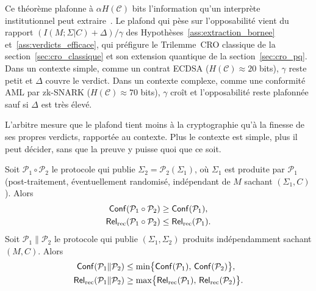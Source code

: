 \begin{sloppypar}
Ce th\'eor\`eme plafonne \`a $\alpha H(\mathcal{C})$ bits l'information qu'un interpr\`ete
institutionnel peut extraire~\cite{Smith09,Alvim12}. Le plafond qui p\`ese sur
l'opposabilit\'e vient du rapport $(I(M;\Sigma|C)+\Delta)/\gamma$ des Hypoth\`eses~\ref{ass:extraction_bornee}
et~\ref{ass:verdicts_efficace}, qui pr\'efigure le Trilemme~CRO classique de la section~\ref{sec:cro_classique} et son extension quantique de la section~\ref{sec:cro_pq}. Dans un contexte
simple, comme un contrat ECDSA ($H(\mathcal{C}) \approx 20$ bits), $\gamma$ reste petit et
$\Delta$ couvre le verdict. Dans un contexte complexe, comme une conformit\'e AML par
zk-SNARK ($H(\mathcal{C}) \approx 70$ bits), $\gamma$ cro\^it et l'opposabilit\'e reste plafonn\'ee
sauf si $\Delta$ est tr\`es \'elev\'e.

\begin{boiteArbitre}
L'arbitre mesure que le plafond tient moins \`a la cryptographie qu'\`a
la finesse de ses propres verdicts, rapport\'ee au contexte. Plus le contexte est simple, plus il peut
d\'ecider, sans que la preuve y puisse quoi que ce soit.
\end{boiteArbitre}

\begin{theorem}\label{thm:composition_sequentielle}
Soit $\mathcal{P}_1 \circ \mathcal{P}_2$ le protocole qui publie
$\Sigma_2 = \mathcal{P}_2(\Sigma_1)$, o\`u $\Sigma_1$ est produite par
$\mathcal{P}_1$ (post-traitement, \'eventuellement randomis\'e,
ind\'ependant de $M$ sachant $(\Sigma_1, C)$). Alors
\begin{align}
\mathsf{Conf}(\mathcal{P}_1 \circ \mathcal{P}_2) &\geq \mathsf{Conf}(\mathcal{P}_1),
  \label{eq:comp_seq_conf}\\
\mathsf{Rel}_{\mathrm{rec}}(\mathcal{P}_1 \circ \mathcal{P}_2) &\leq \mathsf{Rel}_{\mathrm{rec}}(\mathcal{P}_1).
  \label{eq:comp_seq_rel}
\end{align}
Soit $\mathcal{P}_1 \| \mathcal{P}_2$ le protocole qui publie
$(\Sigma_1,\Sigma_2)$ produits ind\'ependamment sachant $(M,C)$. Alors
\begin{align}
\mathsf{Conf}(\mathcal{P}_1 \| \mathcal{P}_2) &\leq \min\bigl\{\mathsf{Conf}(\mathcal{P}_1),\, \mathsf{Conf}(\mathcal{P}_2)\bigr\},
  \label{eq:comp_par_conf}\\
\mathsf{Rel}_{\mathrm{rec}}(\mathcal{P}_1 \| \mathcal{P}_2) &\geq \max\bigl\{\mathsf{Rel}_{\mathrm{rec}}(\mathcal{P}_1),\, \mathsf{Rel}_{\mathrm{rec}}(\mathcal{P}_2)\bigr\}.
  \label{eq:comp_par_rel}
\end{align}
\end{theorem}

\begin{Preuve}\label{prv:composition}


\end{Preuve}
\end{sloppypar}
